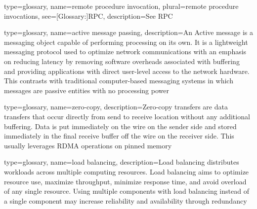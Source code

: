 {
  type=glossary,
  name={remote procedure invocation},
  plural={remote procedure invocations},
  see={[Glossary:]{RPC}},
  description={See RPC}
}

{
  type=glossary,
  name={active message passing},
  description={An Active message is a messaging object
  capable of performing processing on its own. It is a lightweight
  messaging protocol used to optimize network communications with an
  emphasis on reducing latency by removing software overheads
  associated with buffering and providing applications with direct
  user-level access to the network hardware. This contrasts with
  traditional computer-based messaging systems in which messages are
  passive entities with no processing power}
}

{
  type={glossary},
  name={zero-copy},
  description={Zero-copy transfers are data transfers that occur directly from send to receive location without any additional buffering. Data is put immediately on the wire on the sender side and stored immediately in the final receive buffer off the wire on the receiver side. This usually leverages \gls{RDMA} operations on pinned memory}
}

{
  type={glossary},
  name={load balancing},
  description={Load balancing distributes workloads across multiple
  computing resources. Load balancing aims to optimize resource use,
  maximize throughput, minimize response time, and avoid overload of
  any single resource. Using multiple components with load balancing
  instead of a single component may increase reliability and
  availability through redundancy}  
}

